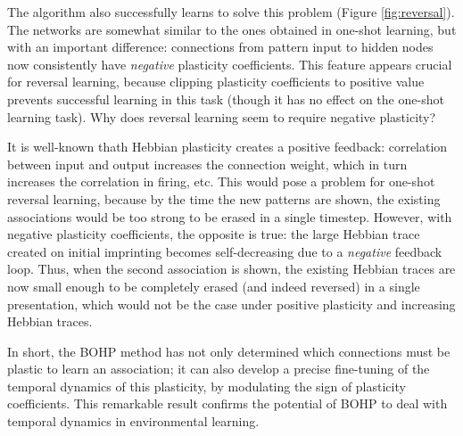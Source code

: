\documentclass{article}
\begin{document}
The algorithm also successfully learns to solve this problem (Figure
\ref{fig:reversal}). The networks are somewhat similar to the ones obtained in
one-shot
learning, but with an important difference: connections from pattern input
to hidden nodes now consistently have \emph{negative} plasticity coefficients. This feature
appears crucial for reversal learning, because clipping plasticity coefficients
to positive value prevents successful learning in this task (though it has no
effect on the one-shot learning task). Why does reversal learning seem to require negative plasticity?

It is well-known thath Hebbian plasticity creates a positive feedback:
correlation between input and output increases the connection weight, which in
turn increases the correlation in firing, etc. This would pose a problem for
one-shot reversal learning, because by the time the new patterns are shown, the
existing associations would be too strong to be erased in a single timestep.
However, with negative plasticity coefficients, the opposite is true: the large
Hebbian trace created on initial imprinting becomes self-decreasing due to a
\emph{negative} feedback loop. Thus, when the second association is shown, the
existing Hebbian traces  are now small enough to be completely erased (and
indeed reversed) in a single presentation, which would not be the case under
positive plasticity and increasing Hebbian traces.

In short, the BOHP method has not only determined which connections must be
plastic to learn an association; it can also develop a precise fine-tuning of
the temporal dynamics of this plasticity, by modulating the sign of plasticity
coefficients. This remarkable result confirms the potential of BOHP to deal with
temporal dynamics in environmental learning.



\small
\printbibliography
\end{document}
